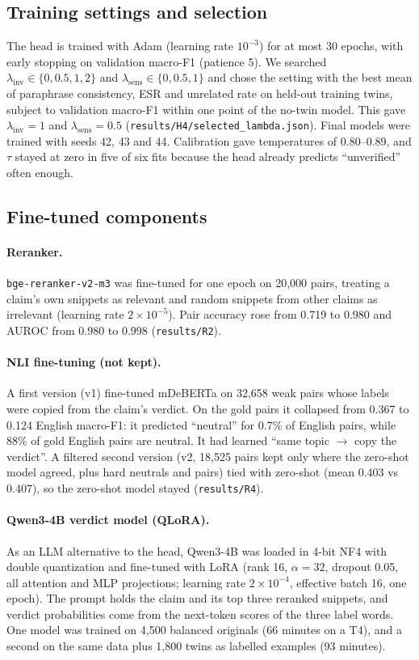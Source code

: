 \subsection{Training settings and selection}
The head is trained with Adam (learning rate $10^{-3}$) for at most 30 epochs, with early stopping on validation macro-F1 (patience 5). We searched $\lambda_{\text{inv}} \in \{0, 0.5, 1, 2\}$ and $\lambda_{\text{sens}} \in \{0, 0.5, 1\}$ and chose the setting with the best mean of paraphrase consistency, ESR and unrelated rate on held-out training twins, subject to validation macro-F1 within one point of the no-twin model. This gave $\lambda_{\text{inv}}=1$ and $\lambda_{\text{sens}}=0.5$ (\texttt{results/H4/selected\_lambda.json}). Final models were trained with seeds 42, 43 and 44. Calibration gave temperatures of 0.80--0.89, and $\tau$ stayed at zero in five of six fits because the head already predicts ``unverified'' often enough.

\subsection{Fine-tuned components}
\paragraph{Reranker.} \texttt{bge-reranker-v2-m3} was fine-tuned for one epoch on 20,000 pairs, treating a claim's own snippets as relevant and random snippets from other claims as irrelevant (learning rate $2\times10^{-5}$). Pair accuracy rose from 0.719 to 0.980 and AUROC from 0.980 to 0.998 (\texttt{results/R2}).

\paragraph{NLI fine-tuning (not kept).} A first version (v1) fine-tuned mDeBERTa on 32,658 weak pairs whose labels were copied from the claim's verdict. On the gold pairs it collapsed from 0.367 to 0.124 English macro-F1: it predicted ``neutral'' for 0.7\% of English pairs, while 88\% of gold English pairs are neutral. It had learned ``same topic $\rightarrow$ copy the verdict''. A filtered second version (v2, 18,525 pairs kept only where the zero-shot model agreed, plus hard neutrals and  pairs) tied with zero-shot (mean 0.403 vs 0.407), so the zero-shot model stayed (\texttt{results/R4}).

\paragraph{Qwen3-4B verdict model (QLoRA).} As an LLM alternative to the head, Qwen3-4B was loaded in 4-bit NF4 with double quantization and fine-tuned with LoRA \citep{hu2022lora,dettmers2023qlora} (rank 16, $\alpha=32$, dropout 0.05, all attention and MLP projections; learning rate $2\times10^{-4}$, effective batch 16, one epoch). The prompt holds the claim and its top three reranked snippets, and verdict probabilities come from the next-token scores of the three label words. One model was trained on 4,500 balanced originals (66 minutes on a T4), and a second on the same data plus 1,800 twins as labelled examples (93 minutes).


